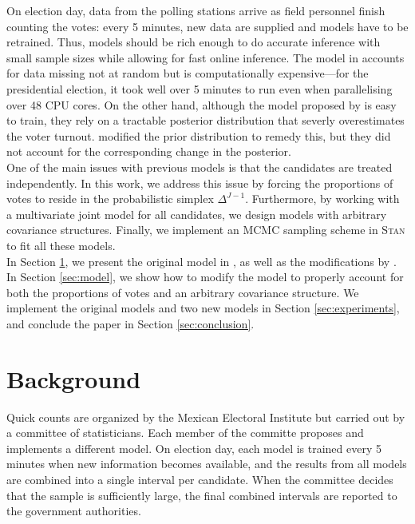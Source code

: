 \documentclass{article}
\begin{document}
On election day, data from the polling stations arrive as field personnel finish counting the votes: every 5 minutes, new data are supplied and models have to be retrained. Thus, models should be rich enough to do accurate inference with small sample sizes while allowing for fast online inference. The model in \citep{anzarut2018} accounts for data missing not at random but is computationally expensive---for the presidential election, it took well over 5 minutes to run even when parallelising over 48 CPU cores. On the other hand, although the model proposed by \citep{mendoza-nieto2016} is easy to train, they rely on a tractable posterior distribution that severly overestimates the voter turnout. \citet{diluvi2018} modified the prior distribution to remedy this, but they did not account for the corresponding change in the posterior.
\\

One of the main issues with previous models is that the candidates are treated independently. In this work, we address this issue by forcing the proportions of votes to reside in the probabilistic simplex $\Delta^{J-1}$. Furthermore, by working with a multivariate joint model for all candidates, we design models with arbitrary covariance structures. Finally, we implement an MCMC sampling scheme in \textsc{Stan} \citet{rstan} to fit all these models.
\\

In Section \ref{sec:background}, we present the original model in \citet{mendoza-nieto2016}, as well as the modifications by \citet{diluvi2018}. In Section \ref{sec:model}, we show how to modify the model to properly account for both the proportions of votes and an arbitrary covariance structure. We implement the original models and two new models in Section \ref{sec:experiments}, and conclude the paper in Section \ref{sec:conclusion}.


\section{Background} \label{sec:background}


Quick counts are organized by the Mexican Electoral Institute but carried out by a committee of statisticians. Each member of the committe proposes and implements a different model. On election day, each model is trained every 5 minutes when new information becomes available, and the results from all models are combined into a single interval per candidate. When the committee decides that the sample is sufficiently large, the final combined intervals are reported to the government authorities. \\
\end{document}
